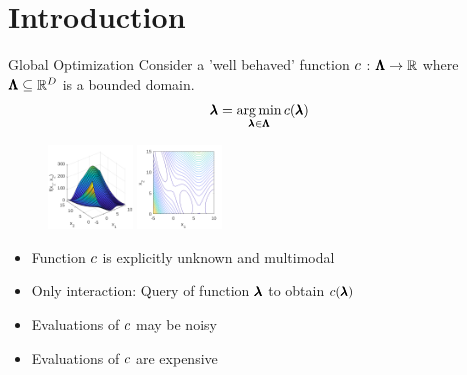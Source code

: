 \section{Introduction}
\begin{frame}[c]{Global Optimization}
Consider a 'well behaved' function $c$ : $\pmb{\Lambda} \rightarrow \mathbb{R}$ where $\pmb{\Lambda} \subseteq \mathbb{R}^D$ is a bounded domain.
\begin{equation*}
  \pmb{\lambda}=\operatorname*{arg\,min}_{\pmb{\lambda}\in\pmb{\Lambda}} c(\pmb{\lambda}) 
\end{equation*}
\begin{figure}
   \begin{multicols}{2}
    \includegraphics[width=0.2\textwidth, right]{images/intro_images/branin.png}
    \includegraphics[width=0.2\textwidth,left]{images/intro_images/branin_countour.png}
 \end{multicols}
\end{figure}
\begin{itemize}
    \item Function $c$ is explicitly unknown and multimodal
    \item Only interaction: Query of function $\pmb{\lambda}$ to obtain $c(\pmb{\lambda})$
    \item Evaluations of $c$ may be noisy
    \item Evaluations of $c$ are expensive
\end{itemize}

\tiny{ }


\end{frame}


